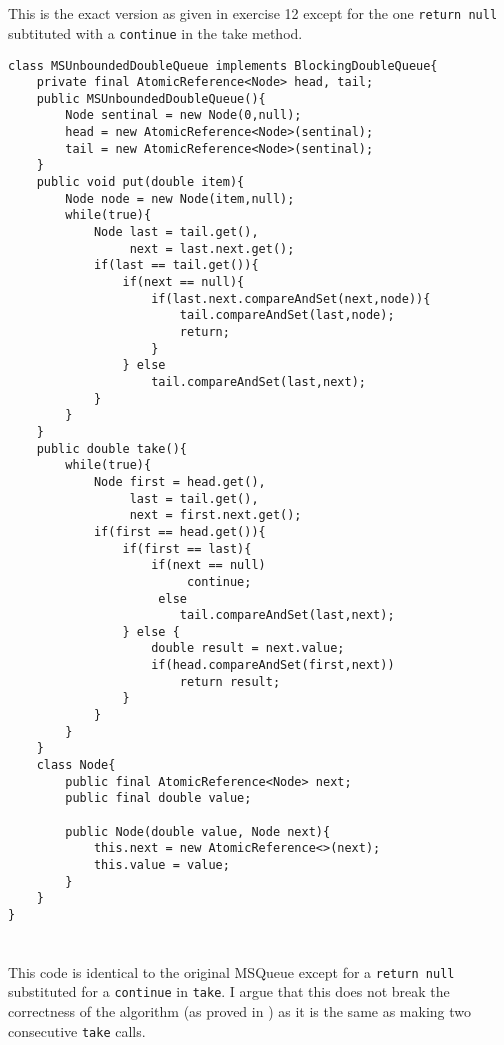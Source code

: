\documentclass{ituhandin}
\begin{document}
\section{}
This is the exact version as given in exercise 12 except for the one \texttt{return null} subtituted with a \texttt{continue} in the take method.
\begin{lstlisting}[caption=Implementation of the \texttt{MSUnboundedDoubleQueue}]
class MSUnboundedDoubleQueue implements BlockingDoubleQueue{
    private final AtomicReference<Node> head, tail;
    public MSUnboundedDoubleQueue(){
        Node sentinal = new Node(0,null);
        head = new AtomicReference<Node>(sentinal);
        tail = new AtomicReference<Node>(sentinal);
    }
    public void put(double item){
        Node node = new Node(item,null);
        while(true){
            Node last = tail.get(), 
                 next = last.next.get();
            if(last == tail.get()){
                if(next == null){
                    if(last.next.compareAndSet(next,node)){
                        tail.compareAndSet(last,node);
                        return;
                    }
                } else 
                    tail.compareAndSet(last,next);
            }
        }
    }
    public double take(){ 
        while(true){
            Node first = head.get(),
                 last = tail.get(),
                 next = first.next.get();
            if(first == head.get()){
                if(first == last){
                    if(next == null)
                         continue;
                     else 
                        tail.compareAndSet(last,next);
                } else {
                    double result = next.value;
                    if(head.compareAndSet(first,next))
                        return result;
                }
            }
        }
    }
    class Node{
        public final AtomicReference<Node> next;
        public final double value;

        public Node(double value, Node next){
            this.next = new AtomicReference<>(next);
            this.value = value;
        }
    }
}
\end{lstlisting}

\section{}

This code is identical to the original MSQueue except for a \texttt{return null} substituted for a \texttt{continue} in \texttt{take}. I argue that this does not break the correctness of the algorithm (as proved in \cite{michael1996simple}) as it is the same as making two consecutive \texttt{take} calls. 
\end{document}
